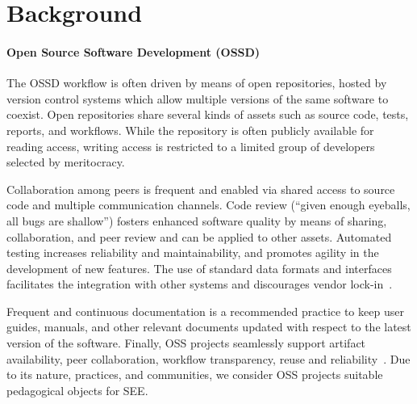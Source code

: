 \documentclass[sigconf]{acmart}
\begin{document}

\section{Background}
\label{sec:background}

\paragraph{Open Source Software Development (OSSD)}
The OSSD workflow is often driven by means of open repositories, hosted by version control systems which allow multiple versions of the same software to coexist. 
%
Open repositories share several kinds of assets such as source code, tests, reports, and workflows. 
While the repository is often publicly available for reading access, writing access is restricted to a limited group of developers selected by meritocracy. 

Collaboration among peers is frequent and enabled via shared access to source code and multiple communication channels. 
%
Code review (``given enough eyeballs, all bugs are shallow'') fosters enhanced software quality by means of sharing, collaboration, and peer review and can be applied to other assets. 
Automated testing increases reliability and maintainability, and promotes agility in the development of new features. 
The use of standard data formats and interfaces facilitates the integration with other systems and discourages vendor lock-in~\cite{flach:sbc:2021}. 

Frequent and continuous documentation is a recommended practice to keep user guides, manuals, and other relevant documents updated with respect to the latest version of the software. 
Finally,
OSS projects seamlessly support artifact availability, peer collaboration, workflow transparency, reuse and reliability~\cite{flach:sbc:2021}.
Due to its nature, practices, and communities, we consider  OSS projects suitable pedagogical objects for SEE.
\end{document}
